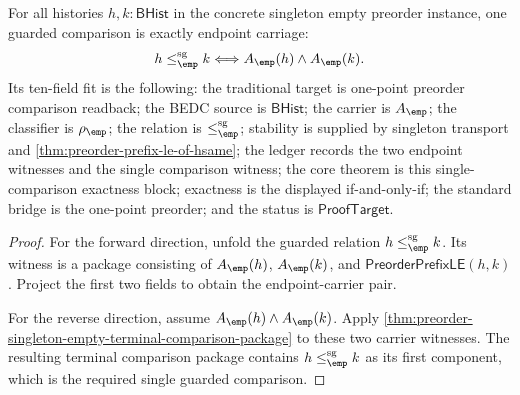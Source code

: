 \begin{theorem}
\label{thm:preorder-singleton-empty-single-comparison-exactness}
For all histories $h,k:\mathsf{BHist}$ in the concrete singleton empty
preorder instance, one guarded comparison is exactly endpoint carriage:
$$
h\le_{\emp}^{\mathrm{sg}}k
\Longleftrightarrow
A_{\emp}(h)\land A_{\emp}(k).
$$
Its ten-field fit is the following: the traditional target is one-point
preorder comparison readback; the BEDC source is $\mathsf{BHist}$; the carrier
is $A_{\emp}$; the classifier is $\rho_{\emp}$; the relation is
$\le_{\emp}^{\mathrm{sg}}$; stability is supplied by singleton transport and
\autoref{thm:preorder-prefix-le-of-hsame}; the ledger records the two endpoint
witnesses and the single comparison witness; the core theorem is this
single-comparison exactness block; exactness is the displayed if-and-only-if;
the standard bridge is the one-point preorder; and the status is
$\mathsf{ProofTarget}$.
\end{theorem}
\begin{proof}
For the forward direction, unfold the guarded relation
$h\le_{\emp}^{\mathrm{sg}}k$. Its witness is a package consisting of
$A_{\emp}(h)$, $A_{\emp}(k)$, and
$\mathsf{PreorderPrefixLE}(h,k)$. Project the first two fields to obtain the
endpoint-carrier pair.

For the reverse direction, assume $A_{\emp}(h)\land A_{\emp}(k)$. Apply
\autoref{thm:preorder-singleton-empty-terminal-comparison-package} to these
two carrier witnesses. The resulting terminal comparison package contains
$h\le_{\emp}^{\mathrm{sg}}k$ as its first component, which is the required
single guarded comparison.
\end{proof}

